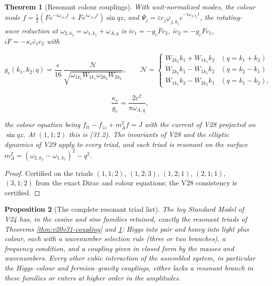 \documentclass[11pt]{article}
\newtheorem{theorem}{Theorem}[section]
\newtheorem{proposition}[theorem]{Proposition}
\theoremstyle{remark}
\begin{document}
\begin{theorem}[Resonant colour couplings]
\label{thm:v20v32-coupling}
With unit-normalized modes, the colour mode
\(f=\tfrac12(Fe^{-i\omega_{A,q}t}+\bar Fe^{i\omega_{A,q}t})\sin qz\), and
\(\Psi_j=\varepsilon c_j\varphi_{j,k_j}e^{-i\omega_{j,k_j}t}\), the
rotating-wave reduction at \(\omega_{2,k_2}=\omega_{1,k_1}+\omega_{A,q}\) is
\(i\dot c_1=-g_c\bar Fc_2\), \(i\dot c_2=-g_cFc_1\),
\(i\dot F=-\kappa_c\bar c_1c_2\) with

\[
 g_c(k_1,k_2;q)=\frac e{16}\,\frac{\mathcal N}{\sqrt{\omega_{1k_1}W_{1k_1}\omega_{2k_2}W_{2k_2}}},\qquad
 \mathcal N=\begin{cases}W_{2k_2}k_1+W_{1k_1}k_2&(q=k_1+k_2)\\ W_{2k_2}k_1-W_{1k_1}k_2&(q=k_2-k_1)\\ W_{1k_1}k_2-W_{2k_2}k_1&(q=k_1-k_2),\end{cases}
                                                                    \tag{35.2}
\]

\[
 \frac{\kappa_c}{g_c}=\frac{2\varepsilon^2}{\pi\omega_{A,q}},              \tag{35.3}
\]

the colour equation being \(f_{tt}-f_{zz}+m_A^2f=J\) with the current
of V28 projected on \(\sin qz\).  At \((1,1;2)\) this is (31.2).  The
invariants of V28 and the elliptic dynamics of V29 apply to every
triad, and each triad is resonant on the surface
\(m_A^2=(\omega_{2,k_2}-\omega_{1,k_1})^2-q^2\).
\end{theorem}

\begin{proof}
Certified on the triads \((1,1;2)\), \((1,2;3)\), \((1,2;1)\),
\((2,1;1)\), \((3,1;2)\) from the exact Dirac and colour equations;
the V28 consistency is certified.
\end{proof}

\begin{proposition}[The complete resonant triad list]
\label{prop:v20v32-list}
The toy Standard Model of V24 has, in the cosine and sine families
retained, exactly the resonant triads of Theorems
\ref{thm:v20v31-coupling} and \ref{thm:v20v32-coupling}: Higgs into
pair and heavy into light plus colour, each with a wavenumber
selection rule (three or two branches), a frequency condition, and
a coupling given in closed form by the masses and wavenumbers.
Every other cubic interaction of the assembled system, in
particular the Higgs--colour and fermion--gravity couplings, either
lacks a resonant branch in these families or enters at higher order
in the amplitudes.
\end{proposition}
\end{document}
